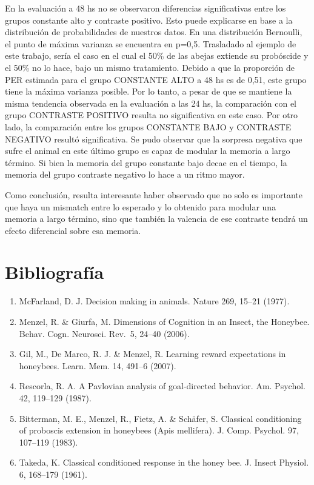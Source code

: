 \documentclass[]{article}
\providecommand{\tightlist}{%
  \setlength{\itemsep}{0pt}\setlength{\parskip}{0pt}}
\begin{document}
En la evaluación a 48 hs no se observaron diferencias significativas
entre los grupos constante alto y contraste positivo. Esto puede
explicarse en base a la distribución de probabilidades de nuestros
datos. En una distribución Bernoulli, el punto de máxima varianza se
encuentra en p=0,5. Trasladado al ejemplo de este trabajo, sería el caso
en el cual el 50\% de las abejas extiende su probóscide y el 50\% no lo
hace, bajo un mismo tratamiento. Debido a que la proporción de PER
estimada para el grupo CONSTANTE ALTO a 48 hs es de 0,51, este grupo
tiene la máxima varianza posible. Por lo tanto, a pesar de que se
mantiene la misma tendencia observada en la evaluación a las 24 hs, la
comparación con el grupo CONTRASTE POSITIVO resulta no significativa en
este caso. Por otro lado, la comparación entre los grupos CONSTANTE BAJO
y CONTRASTE NEGATIVO resultó significativa. Se pudo observar que la
sorpresa negativa que sufre el animal en este último grupo es capaz de
modular la memoria a largo término. Si bien la memoria del grupo
constante bajo decae en el tiempo, la memoria del grupo contraste
negativo lo hace a un ritmo mayor.

Como conclusión, resulta interesante haber observado que no solo es
importante que haya un mismatch entre lo esperado y lo obtenido para
modular una memoria a largo término, sino que también la valencia de ese
contraste tendrá un efecto diferencial sobre esa memoria.

\hypertarget{bibliografuxeda}{%
\section{Bibliografía}\label{bibliografuxeda}}

\begin{enumerate}
\def\labelenumi{\arabic{enumi}.}
\tightlist
\item
  McFarland, D. J. Decision making in animals. Nature 269, 15--21
  (1977).
\item
  Menzel, R. \& Giurfa, M. Dimensions of Cognition in an Insect, the
  Honeybee. Behav. Cogn. Neurosci. Rev.~5, 24--40 (2006).
\item
  Gil, M., De Marco, R. J. \& Menzel, R. Learning reward expectations in
  honeybees. Learn. Mem. 14, 491--6 (2007).
\item
  Rescorla, R. A. A Pavlovian analysis of goal-directed behavior. Am.
  Psychol. 42, 119--129 (1987).
\item
  Bitterman, M. E., Menzel, R., Fietz, A. \& Schäfer, S. Classical
  conditioning of proboscis extension in honeybees (Apis mellifera). J.
  Comp. Psychol. 97, 107--119 (1983).
\item
  Takeda, K. Classical conditioned response in the honey bee. J. Insect
  Physiol. 6, 168--179 (1961).
\end{enumerate}
\end{document}
